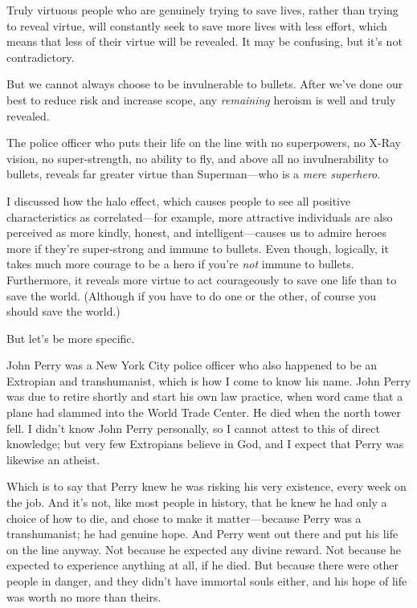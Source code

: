{
 Truly virtuous people who are genuinely trying to save lives,
rather than trying to reveal virtue, will constantly seek to save more
lives with less effort, which means that less of their virtue will be
revealed. It may be confusing, but it's not
contradictory.}

{
 But we cannot always choose to be invulnerable to bullets. After
we've done our best to reduce risk and increase scope,
any \textit{remaining} heroism is well and truly revealed.}

{
 The police officer who puts their life on the line with no
superpowers, no X-Ray vision, no super-strength, no ability to fly, and
above all no invulnerability to bullets, reveals far greater virtue
than Superman---who is a \textit{mere superhero}.}

\myendsectiontext


\bigskip


{
 I discussed how the halo effect, which causes people to see all
positive characteristics as correlated---for example, more attractive
individuals are also perceived as more kindly, honest, and
intelligent---causes us to admire heroes more if
they're super-strong and immune to bullets. Even
though, logically, it takes much more courage to be a hero if
you're \textit{not} immune to bullets. Furthermore, it
reveals more virtue to act courageously to save one life than to save
the world. (Although if you have to do one or the other, of course you
should save the world.) }

{
 But let's be more specific.}

{
 John Perry was a New York City police officer who also happened to
be an Extropian and transhumanist, which is how I come to know his
name. John Perry was due to retire shortly and start his own law
practice, when word came that a plane had slammed into the World Trade
Center. He died when the north tower fell. I didn't
know John Perry personally, so I cannot attest to this of direct
knowledge; but very few Extropians believe in God, and I expect that
Perry was likewise an atheist.}

{
 Which is to say that Perry knew he was risking his very existence,
every week on the job. And it's not, like most people
in history, that he knew he had only a choice of how to die, and chose
to make it matter---because Perry was a transhumanist; he had genuine
hope. And Perry went out there and put his life on the line anyway. Not
because he expected any divine reward. Not because he expected to
experience anything at all, if he died. But because there were other
people in danger, and they didn't have immortal souls
either, and his hope of life was worth no more than theirs.}

